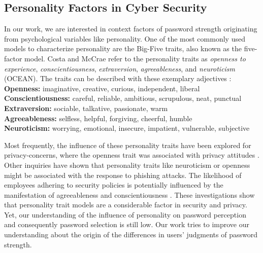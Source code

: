 \subsection{Personality Factors in Cyber Security}
In our work, we are interested in context factors of password strength originating from psychological variables like personality. One of the most commonly used models to characterize personality are the Big-Five traits, also known as the five-factor model. Costa and McCrae \cite{Costa1992NEO} refer to the personality traits as \textit{openness to experience}, \textit{conscientiousness}, \textit{extraversion}, \textit{agreeableness}, and \textit{neuroticism} (OCEAN). The traits can be described with these exemplary adjectives \cite{McCrae1987ValidationFFM}:\\
\textbf{Openness:} imaginative, creative, curious, independent, liberal\\
\textbf{Conscientiousness:} careful, reliable, ambitious, scrupulous, neat, punctual\\
\textbf{Extraversion:} sociable, talkative, passionate, warm\\
\textbf{Agreeableness:} selfless, helpful, forgiving, cheerful, humble\\
\textbf{Neuroticism:} worrying, emotional, insecure, impatient, vulnerable, subjective

Most frequently, the influence of these personality traits have been explored for privacy-concerns, where the openness trait was associated with privacy attitudes \cite{Egelman2015PredictingAttitudes,Minkus2014PersonalizationPrivacy}. Other inquiries have shown that personality traits like neuroticism \cite{Halevi2013PilotStudyPersonality} or openness \cite{Uebelacker2014SocialEngineering} might be associated with the response to phishing attacks. The likelihood of employees adhering to security policies is potentially influenced by the manifestation of agreeableness and conscientiousness \cite{Shropshire2006PersonalityITSec,Shropshire2015}. These investigations show that personality trait models are a considerable factor in security and privacy. Yet, our understanding of the influence of personality on password perception and consequently password selection is still low. Our work tries to improve our understanding about the origin of the differences in users' judgments of password strength. 

